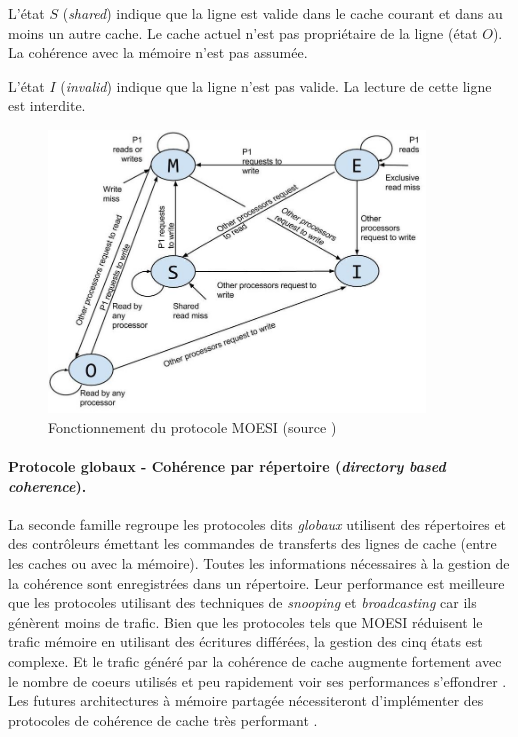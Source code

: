 L'état $S$ (\textit{shared}) indique que la ligne est valide dans le cache courant et dans au moins un autre cache. Le cache actuel n'est pas propriétaire de la ligne (état $O$). La cohérence avec la mémoire n'est pas assumée. 

L'état $I$ (\textit{invalid}) indique que la ligne n'est pas valide. La lecture de cette ligne est interdite.


\begin{figure}
    \center
    \includegraphics[width=10cm]{images/moesi.png}
    \caption{\label{pic:moesi} Fonctionnement du protocole MOESI (source \cite{Sayin2014})}
\end{figure}





\paragraph{Protocole globaux - Cohérence par répertoire (\textit{directory based coherence}).}

La seconde famille regroupe les protocoles dits \textit{globaux} utilisent des répertoires et des contrôleurs émettant les commandes de transferts des lignes de cache (entre les caches ou avec la mémoire)\cite{tang1976cache}. Toutes les informations nécessaires à la gestion de la cohérence sont enregistrées dans un répertoire. Leur performance est meilleure que les protocoles utilisant des techniques de \textit{snooping} et \textit{broadcasting} car ils génèrent moins de trafic. Bien que les protocoles tels que MOESI réduisent le trafic mémoire en utilisant des écritures différées, la gestion des cinq états est complexe. Et le trafic généré par la cohérence de cache augmente fortement avec le nombre de coeurs utilisés et peu rapidement voir ses performances s'effondrer \cite{liu2016protocoles}. Les futures architectures à mémoire partagée nécessiteront d'implémenter des protocoles de cohérence de cache très performant  \cite{al2010snoopy}.





